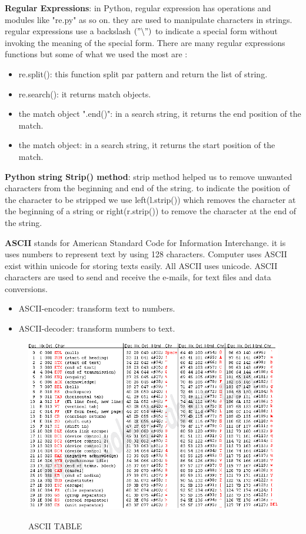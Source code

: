 \begin{itemize}
\textbf{Regular Expressions}: in Python, regular expression has operations and modules like "re.py" as so on. they are used to manipulate characters in strings. regular expressions use a backslash $(" \backslash  ")$  to indicate a special form without invoking the meaning of the special form. There are many regular expressions functions but some of what we used the most are :
\begin{itemize}
\item re.split(): this function split par pattern and return the list of string.
\item re.search(): it returns match objects.
\item the match object ".end()": in a search string, it returns the end position of the match.
\item the match object: in a search string, it returns the start position of the match.
\end{itemize}

\textbf{Python string Strip() method}: strip method helped us to remove unwanted characters from the beginning and end of the string. to indicate the position of the character to be stripped we use left(l.strip()) which removes the character at the beginning of a string or right(r.strip()) to remove the character at the end of the string.

\textbf{ASCII} stands for American Standard Code for Information Interchange. it is uses numbers to represent text by using 128 characters. Computer uses ASCII exist within unicode for storing texts easily. All  ASCII uses unicode. ASCII characters are used to send and receive the e-mails, for text files and data conversions. 


\begin{itemize}
\item  ASCII-encoder: transform text to numbers.
\item  ASCII-decoder: transform numbers to text.
\end{itemize}
\newpage
\begin{figure}[hbtp]
\caption{ASCII TABLE}
\centering
\includegraphics[scale=.5]{images/ASCII.png}\label{ASCII}
\end{figure}
\end{itemize}

